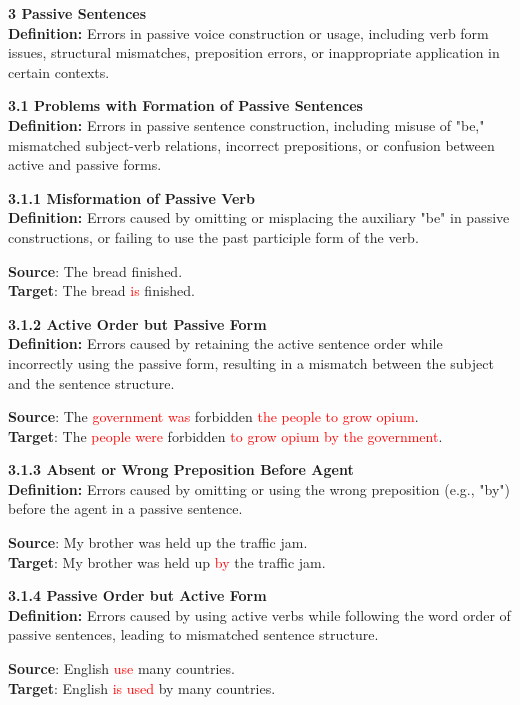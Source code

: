 \begin{tcolorbox}[breakable]
\noindent \textbf{3 Passive Sentences}\\
\textbf{Definition:} Errors in passive voice construction or usage, including verb form issues, structural mismatches, preposition errors, or inappropriate application in certain contexts.

\noindent \textbf{3.1 Problems with Formation of Passive Sentences}\\
\textbf{Definition:} Errors in passive sentence construction, including misuse of "be," mismatched subject-verb relations, incorrect prepositions, or confusion between active and passive forms.

\noindent \textbf{3.1.1 Misformation of Passive Verb}\\
\textbf{Definition:} Errors caused by omitting or misplacing the auxiliary "be" in passive constructions, or failing to use the past participle form of the verb.


\textbf{Source}: The bread finished. \\
\textbf{Target}: The bread \textcolor{red}{is} finished.


\noindent \textbf{3.1.2 Active Order but Passive Form}\\
\textbf{Definition:} Errors caused by retaining the active sentence order while incorrectly using the passive form, resulting in a mismatch between the subject and the sentence structure.


\textbf{Source}: The \textcolor{red}{government was} forbidden \textcolor{red}{the people to grow opium}. \\
\textbf{Target}: The \textcolor{red}{people were} forbidden \textcolor{red}{to grow opium by the government}.


\noindent \textbf{3.1.3 Absent or Wrong Preposition Before Agent}\\
\textbf{Definition:} Errors caused by omitting or using the wrong preposition (e.g., "by") before the agent in a passive sentence.


\textbf{Source}: My brother was held up the traffic jam. \\
\textbf{Target}: My brother was held up \textcolor{red}{by} the traffic jam.


\noindent \textbf{3.1.4 Passive Order but Active Form}\\
\textbf{Definition:} Errors caused by using active verbs while following the word order of passive sentences, leading to mismatched sentence structure.


\textbf{Source}: English \textcolor{red}{use} many countries. \\
\textbf{Target}: English \textcolor{red}{is used} by many countries. \\




\end{tcolorbox}
